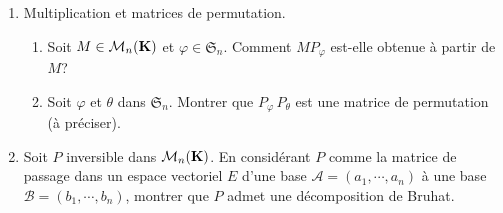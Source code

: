 \begin{enumerate}
  \item Multiplication et matrices de permutation.
\begin{enumerate}
  \item Soit $M\in \mathcal{M}_n(\mathbf{K})$ et $\varphi\in \mathfrak{S}_n$. Comment $MP_\varphi$ est-elle obtenue à partir de $M$?
  \item Soit $\varphi$ et $\theta$ dans $\mathfrak{S}_n$. Montrer que $P_\varphi\,P_\theta$ est une matrice de permutation (à préciser). 
\end{enumerate}

%    

\item Soit $P$ inversible dans $\mathcal{M}_n(\mathbf{K})$. En considérant $P$ comme la matrice de passage dans un espace vectoriel $E$ d'une base $\mathcal{A}=(a_1,\cdots,a_n)$ à une base $\mathcal{B}=(b_1,\cdots,b_n)$, montrer que $P$ admet une décomposition de Bruhat.

\end{enumerate}
